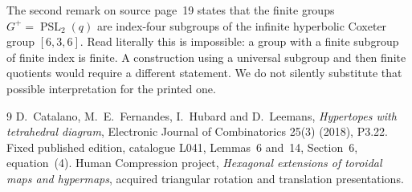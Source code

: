 \documentclass[11pt,a4paper]{article}
\begin{document}
The second remark on source page~19 states that the finite groups
$G^+=\operatorname{PSL}_2(q)$ are index-four subgroups of the
infinite hyperbolic Coxeter group $[6,3,6]$. Read literally this
is impossible: a group with a finite subgroup of finite index
is finite. A construction using a universal subgroup and then
finite quotients would require a different statement. We do not
silently substitute that possible interpretation for the printed one.

\begin{thebibliography}{9}
 D.~Catalano, M.~E.~Fernandes, I.~Hubard and
D.~Leemans, \emph{Hypertopes with tetrahedral diagram},
Electronic Journal of Combinatorics 25(3) (2018), P3.22.
Fixed published edition, catalogue L041, Lemmas~6 and~14,
Section~6, equation~(4).
 Human Compression project,
\emph{Hexagonal extensions of toroidal maps and hypermaps},
acquired triangular rotation and translation presentations.
\end{thebibliography}
\end{document}
